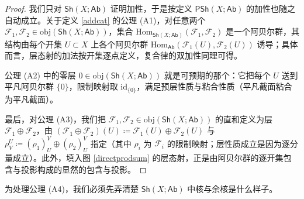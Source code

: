 \begin{proof}
我们只对 $\mathsf{Sh}(X;\mathsf{Ab})$ 证明加性，于是按定义 $\mathsf{PSh}(X;\mathsf{Ab})$ 的加性也随之自动成立。关于定义 \ref{addcat} 的公理 (A1)，对任意两个 $\mathcal{F}_1,\mathcal{F}_2\in\text{obj}(\mathsf{Sh}(X;\mathsf{Ab}))$，集合 $\text{Hom}_{\mathsf{Sh}(X;\mathsf{Ab})}(\mathcal{F}_1,\mathcal{F}_2)$ 是一个阿贝尔群，其结构由每个开集 $U\subset X$ 上各个阿贝尔群 $\text{Hom}_\mathsf{Ab}(\mathcal{F}_1(U),\mathcal{F}_2(U))$ 诱导；具体而言，层态射的加法按开集逐点定义，复合律的双加性同理可得。

公理 (A2) 中的零层 $0\in\text{obj}(\mathsf{Sh}(X;\mathsf{Ab}))$ 就是可预期的那个：它把每个 $U$ 送到平凡阿贝尔群 $\{0\}$，限制映射取 $\text{id}_{\{0\}}$，满足预层性质与粘合性质（平凡截面粘合为平凡截面）。

最后，对公理 (A3)，我们把 $\mathcal{F}_1,\mathcal{F}_2\in\text{obj}(\mathsf{Sh}(X;\mathsf{Ab}))$ 的直和定义为层 $\mathcal{F}_1 \oplus\mathcal{F}_2$，由 $(\mathcal{F}_1 \oplus\mathcal{F}_2)(U)\coloneqq\mathcal{F}_1(U)\oplus\mathcal{F}_2(U)$ 与 $\rho^U_V\coloneqq(\rho_1)^V_U\oplus(\rho_2)^V_U$ 指定（其中 $\rho_i$ 为 $\mathcal{F}_i$ 的限制映射；层性质成立是因为逐分量成立）。此外，填入图 \eqref{directprodsum} 的层态射，正是由阿贝尔群的逐开集包含与投影构成的显然的包含与投影。
\end{proof}

为处理公理 (A4)，我们必须先弄清楚 $\mathsf{Sh}(X;\mathsf{Ab})$ 中核与余核是什么样子。

